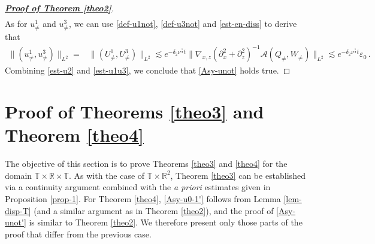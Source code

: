 \documentclass[11pt,reqno]{article}
\numberwithin{equation}{section}
\newcommand\R{{\mathbb R}}
\newcommand\T{{\mathbb T}}
\newcommand\A{\mathcal{A}}
\let\pa=\partial
\let\var=\varepsilon
\let\f=\frac
\begin{document}
\begin{proof}[\textbf{\underline{Proof of Theorem \ref{theo2}}}]
\begin{align}
\end{align}
As for $u^1_{\not=}$ and $u^3_{\not=}$, we can use \eqref{def-u1not}, \eqref{def-u3not} and \eqref{est-en-diss} to derive that
\begin{align}\label{est-u1u3}
	\|(u^1_{\not=},u^3_{\not=})\|_{L^2}
	=&\|(U^1_{\not=},U^3_{\not=})\|_{L^2}
	\lesssim  e^{-\delta_2\nu^{\f13}t} \|\nabla_{x,z}(\pa_x^2+\pa_z^2)^{-1}\A (Q_{\not=}, W_{\not=})\|_{L^2}\lesssim e^{-\delta_2\nu^{\f13}t}\var_0\,. %
\end{align}
Combining \eqref{est-u2} and \eqref{est-u1u3}, we conclude that \eqref{Asy-unot} holds true.
\end{proof}



\section{Proof of  Theorems \ref{theo3} and Theorem \ref{theo4}}  \label{sec5:proof-TRT}


The objective of this section is to prove Theorems \ref{theo3} and \ref{theo4} for the domain $\T\times\R\times \T$. As with the case of $\T\times\R^2$, Theorem \ref{theo3} can be established via a continuity argument combined with the \textit{a priori} estimates given in Proposition \ref{prop-1}. For Theorem \ref{theo4}, \eqref{Asy-u0-1'} follows from Lemma \ref{lem-disp-T} (and a similar argument as in Theorem \ref{theo2}), and the proof of \eqref{Asy-unot'} is similar to Theorem \ref{theo2}.
We therefore present only those parts of the proof that differ from the previous case.
\end{document}
